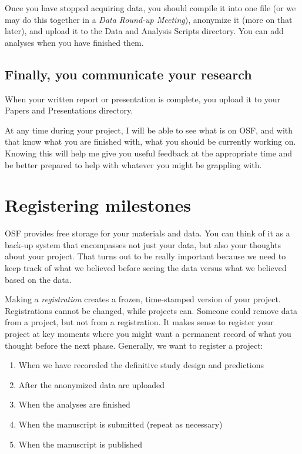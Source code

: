 \documentclass[12pt,]{book}
\providecommand{\tightlist}{%
  \setlength{\itemsep}{0pt}\setlength{\parskip}{0pt}}
\theoremstyle{definition}
\theoremstyle{definition}
\theoremstyle{definition}
\theoremstyle{remark}
\begin{document}
Once you have stopped acquiring data, you should compile it into one
file (or we may do this together in a \emph{Data Round-up Meeting}),
anonymize it (more on that later), and upload it to the Data and
Analysis Scripts directory. You can add analyses when you have finished
them.

\subsection{Finally, you communicate your
research}\label{finally-you-communicate-your-research}

When your written report or presentation is complete, you upload it to
your Papers and Presentations directory.

At any time during your project, I will be able to see what is on OSF,
and with that know what you are finished with, what you should be
currently working on. Knowing this will help me give you useful feedback
at the appropriate time and be better prepared to help with whatever you
might be grappling with.

\section{Registering milestones}\label{registering-milestones}

OSF provides free storage for your materials and data. You can think of
it as a back-up system that encompasses not just your data, but also
your thoughts about your project. That turns out to be really important
because we need to keep track of what we believed before seeing the data
versus what we believed based on the data.

Making a \emph{registration} creates a frozen, time-stamped version of
your project. Registrations cannot be changed, while projects can.
Someone could remove data from a project, but not from a registration.
It makes sense to register your project at key moments where you might
want a permanent record of what you thought before the next phase.
Generally, we want to register a project:

\begin{enumerate}
\def\labelenumi{\arabic{enumi}.}
\tightlist
\item
  When we have recoreded the definitive study design and predictions
\item
  After the anonymized data are uploaded
\item
  When the analyses are finished
\item
  When the manuscript is submitted (repeat as necessary)
\item
  When the manuscript is published
\end{enumerate}
\end{document}
